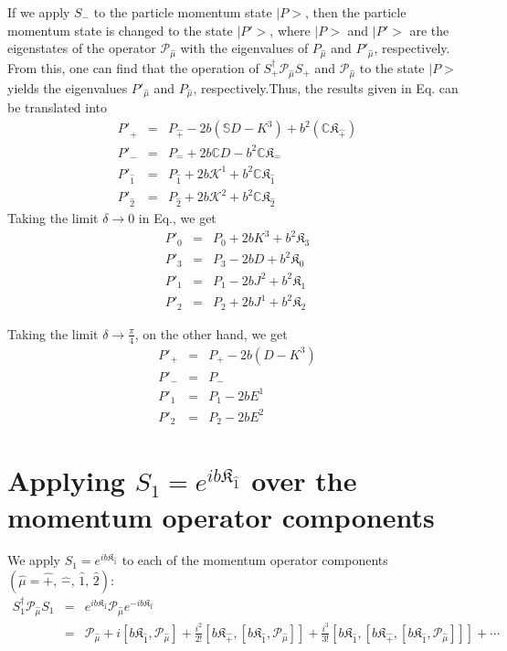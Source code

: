 \documentclass[]{article}
\numberwithin{equation}{section}
\def\bea{\begin{eqnarray}}
\def\eea{\end{eqnarray}}
\def\wh{\widehat}
\begin{document}
{{If we apply $S_-$ to the particle momentum state $|P>$, then the particle momentum state is changed to
the state $|P'>$, where $|P>$ and $|P'>$ are the eigenstates of the operator 
${\mathcal P}_{\wh{\mu}}$ with the eigenvalues of  $P_{\wh{\mu}}$ 
and $P'_{\wh{\mu}}$, respectively. From this, one can find that the operation of 
$S_+^{\dagger} {\mathcal P}_{\wh{\mu}}S_+$ and ${\mathcal P}_{\wh{\mu}}$ to the state $|P>$ yields the eigenvalues 
$P'_{\wh{\mu}}$ and $P_{\wh{\mu}}$, respectively.Thus, the results given in Eq. can be translated into
\bea
P'_{\wh+} & = & P_{\wh+}-2b(\mathbb{S}D-K^3)+{b^2}(\mathbb{C}\mathfrak{K}_{\hat{+}})
\nonumber\\ 
P'_{\wh-} & = & P_{\wh-}+2b\mathbb{C}D-{b^2}\mathbb{C}\mathfrak{K}_\hat{-}
\nonumber\\
P'_{\wh{1}} & = & {P}_{\wh{1}}+2b\mathcal{K}^1+b^2\mathbb{C}\mathfrak{K}_{\hat{1}} \nonumber\\
P'_{\wh{2}} & = & {P}_{\wh{2}}+2b\mathcal{K}^2+b^2\mathbb{C}\mathfrak{K}_{\hat{2}}
\eea
%
Taking the limit $\delta \rightarrow 0$ in Eq., we get
\bea
P'_{0} & = & P_{0}+2bK^3+{b^2}\mathfrak{K}_{3}
\nonumber\\ 
P'_{3} & = & P_{3}-2bD+{b^2}\mathfrak{K}_{0}
\nonumber\\
P'_{{1}} & = & {P}_{{1}}-2bJ^2+b^2\mathfrak{K}_{{1}} \nonumber\\
P'_{{2}} & = & {P}_{{2}}+2bJ^1+b^2\mathfrak{K}_{{2}}
\eea

Taking the limit $\delta \rightarrow \frac{\pi}{4}$, on the other hand, we get
\bea
P'_{+} & = & P_{+}-2b(D-K^3)
\nonumber\\ 
P'_{-} & = & P_{-}
\nonumber\\
P'_{{1}} & = & {P}_{{1}}-2bE^1 \nonumber\\
P'_{{2}} & = & {P}_{{2}}-2bE^2
\eea




\section{Applying $S_1 =e^{ib\mathfrak{K}_{\hat{1}}}$ over the momentum operator components}

We apply $S_1 =e^{ib\mathfrak{K}_{\hat{1}}}$ to each of the momentum operator components $(\wh{\mu} = \wh+,\,\wh- ,\, \wh1,\, \wh2)$:
\bea
S_1^{\dagger} {\mathcal P}_{\wh{\mu}}S_1 & = & e^{ib\mathfrak{K}_{\hat{1}}} {\mathcal P}_{\wh{\mu}} e^{-ib\mathfrak{K}_{\hat{1}}} \nonumber \\
                                 & = & {\mathcal P}_{\wh{\mu}} + i\left[b\mathfrak{K}_{\hat{1}}, {\mathcal P}_{\wh{\mu}} \right] + \frac{i^2}{2!}\left[b\mathfrak{K}_{\hat{+}}, \left[b\mathfrak{K}_{\hat{1}}, {\mathcal P}_{\wh{\mu}} \right]\right] + \frac{i^3}{3!}\left[b\mathfrak{K}_{\hat{1}},\left[b\mathfrak{K}_{\hat{+}}, \left[b\mathfrak{K}_{\hat{1}}, {\mathcal P}_{\wh{\mu}} \right]\right]\right] + \cdots
\eea
% 

}}
\end{document}
